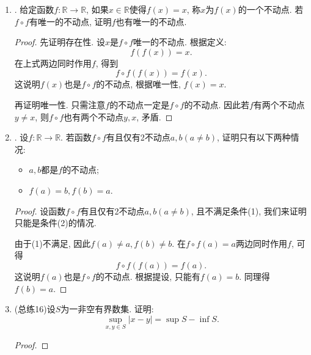 \documentclass[UTF8,11pt, a4paper, oneside, fontset=none]{ctexbook}
\begin{document}
\begin{enumerate}
\begin{proof}
在$y = \sinh x = \frac{e^x - e^{-x}}{2}$中作代换, 令$u = e^x$, 注意$u >0$. 于是得到
\[
u^2 - 2uy -1 =0.
\]
解得
\[
u = y \pm \sqrt{y^2 +1}.
\]
取正解, 得
\[
u = y + \sqrt{y^2 +1} = e^x \Rightarrow x = \ln (y + \sqrt{y^2 +1}).
\]
因此
\[
y = arcsinh x = \ln (x + \sqrt{x^2 +1}).
\]
同理得
\[
y = arccosh x = \ln (x + \sqrt{x^2 -1}).
\]

\end{proof}


\item. 给定函数$f : \mathbb R \to \mathbb R$, 如果$x \in \mathbb R$使得$f(x) =x$, 称$x$为$f(x)$的一个不动点. 若$f \circ f$有唯一的不动点, 证明$f$也有唯一的不动点.


\begin{proof}

先证明存在性. 设$x$是$f \circ f$唯一的不动点. 根据定义:
\[
f(f(x)) = x. 
\]
在上式两边同时作用$f$, 得到
\[
f\circ f(f(x)) = f(x).
\]
这说明$f(x)$也是$f \circ f$的不动点, 根据唯一性, $f(x) = x$.


再证明唯一性. 只需注意$f$的不动点一定是$f \circ f$的不动点. 因此若$f$有两个不动点$y \neq x$, 则$f \circ f$也有两个不动点$y, x$, 矛盾.

\end{proof}


\item. 设$f : \mathbb R \to \mathbb R$. 若函数$f\circ f$有且仅有2不动点$a, b (a \neq b)$, 证明只有以下两种情况:
\begin{itemize}
\item[(1)] $a, b$都是$f$的不动点;
\item[(2)] $f(a)=b, f(b) =a$.
\end{itemize}


\begin{proof}

设函数$f\circ f$有且仅有2不动点$a, b(a \neq b)$, 且不满足条件(1), 我们来证明只能是条件(2)的情况. 


由于(1)不满足, 因此$f(a) \neq a, f(b) \neq b$. 在$f\circ f(a) = a$两边同时作用$f$, 可得
\[
f\circ f (f(a)) = f(a). 
\]
这说明$f(a)$也是$f \circ f$的不动点. 根据提设, 只能有$f(a) = b$. 同理得$f(b) = a$.

\end{proof}


\item (总练16)设$S$为一非空有界数集. 证明:
\[
\sup_{x,y\in S}|x - y| = \sup S - \inf S.
\]


\begin{proof}


\end{proof}
\end{enumerate}
\end{document}
